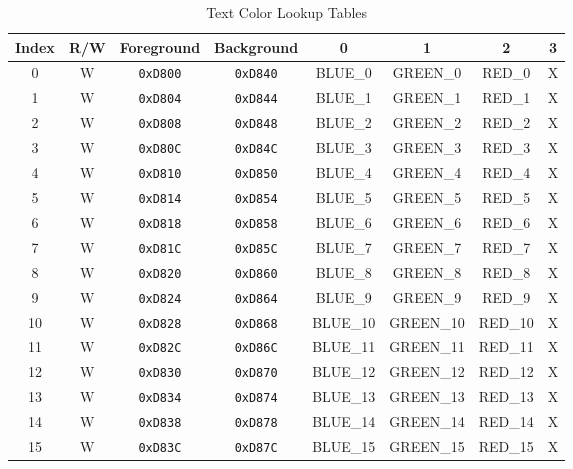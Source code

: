 \begin{table}[h]
    \begin{center}
        \begin{tabular}{|c|c|c|c|c|c|c|c|} \hline
            Index & R/W & Foreground & Background & 0 & 1 & 2 & 3 \\ \hline\hline
            0 & W & \verb+0xD800+ & \verb+0xD840+ & BLUE\_0 & GREEN\_0 & RED\_0 & X \\ \hline
            1 & W & \verb+0xD804+ & \verb+0xD844+ & BLUE\_1 & GREEN\_1 & RED\_1 & X \\ \hline
            2 & W & \verb+0xD808+ & \verb+0xD848+ & BLUE\_2 & GREEN\_2 & RED\_2 & X \\ \hline
            3 & W & \verb+0xD80C+ & \verb+0xD84C+ & BLUE\_3 & GREEN\_3 & RED\_3 & X \\ \hline
            4 & W & \verb+0xD810+ & \verb+0xD850+ & BLUE\_4 & GREEN\_4 & RED\_4 & X \\ \hline
            5 & W & \verb+0xD814+ & \verb+0xD854+ & BLUE\_5 & GREEN\_5 & RED\_5 & X \\ \hline
            6 & W & \verb+0xD818+ & \verb+0xD858+ & BLUE\_6 & GREEN\_6 & RED\_6 & X \\ \hline
            7 & W & \verb+0xD81C+ & \verb+0xD85C+ & BLUE\_7 & GREEN\_7 & RED\_7 & X \\ \hline
            8 & W & \verb+0xD820+ & \verb+0xD860+ & BLUE\_8 & GREEN\_8 & RED\_8 & X \\ \hline
            9 & W & \verb+0xD824+ & \verb+0xD864+ & BLUE\_9 & GREEN\_9 & RED\_9 & X \\ \hline
            10 & W & \verb+0xD828+ & \verb+0xD868+ & BLUE\_10 & GREEN\_10 & RED\_10 & X \\ \hline
            11 & W & \verb+0xD82C+ & \verb+0xD86C+ & BLUE\_11 & GREEN\_11 & RED\_11 & X \\ \hline
            12 & W & \verb+0xD830+ & \verb+0xD870+ & BLUE\_12 & GREEN\_12 & RED\_12 & X \\ \hline
            13 & W & \verb+0xD834+ & \verb+0xD874+ & BLUE\_13 & GREEN\_13 & RED\_13 & X \\ \hline
            14 & W & \verb+0xD838+ & \verb+0xD878+ & BLUE\_14 & GREEN\_14 & RED\_14 & X \\ \hline
            15 & W & \verb+0xD83C+ & \verb+0xD87C+ & BLUE\_15 & GREEN\_15 & RED\_15 & X \\ \hline
        \end{tabular}
    \end{center}
    \caption{Text Color Lookup Tables}
    \label{tab:text_luts}
\end{table}

